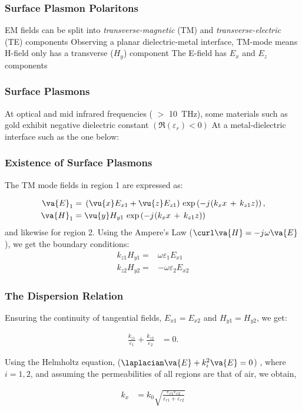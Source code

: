 \documentclass[10pt, compress]{beamer}
\renewcommand{\O}{\omega}  %
\newcommand{\E}{\varepsilon}  %
\renewcommand{\j}{{j}\mkern1mu} %
\begin{document}
\begin{frame}
  \frametitle{Surface Plasmon Polaritons}
  \begin{outline}
    \1 EM fields can be split into \textit{transverse-magnetic} (TM) and \textit{transverse-electric} (TE) components
    \1 Observing a planar dielectric-metal interface, TM-mode means H-field only has a transverse ($H_y$) component
    \2 The E-field has $E_x$ and $E_z$ components
  \end{outline}
\end{frame}

\begin{frame}
  \frametitle{Surface Plasmons}
  \begin{outline}
    \1 At optical and mid infrared frequencies ( $>$ \SI{10}{\tera \hertz}), some materials such as gold exhibit negative dielectric constant $(\Re(\E_r) < 0)$ 
    \1 At a metal-dielectric interface such as the one below:
  \end{outline}
  \begin{figure}
    \centering 
  \def\svgwidth{.75\linewidth}
    
  \end{figure}
\end{frame}


\begin{frame}
  \frametitle{Existence of Surface Plasmons}
  \begin{outline}
    \1 The TM mode fields in region 1 are expressed as:
  \end{outline}
      \begin{align*}
    \va{E}_1 ={}& \left(\vu{x} E_{x1}  + \vu{z} E_{z1}  \right) \, \exp \left( - \j (k_x x \,+\, k_{z1} z) \right), \\
    \va{H}_1 ={}& \vu{y} H_{y1}  \, \exp \left( - \j (k_x x \,+\, k_{z1} z) \right)
  \end{align*}
  and likewise for region 2. Using the Ampere's Law ($\curl \va{H} = -\j \O \va{E}$), we get the boundary conditions:
    \begin{align*}
    k_{z1} H_{y1} ={}& \O \E_1 E_{x1}\\
    k_{z2} H_{y2} ={}& -\O \E_2 E_{x2}
  \end{align*}
\end{frame}

\begin{frame}
  \frametitle{The Dispersion Relation}
  \begin{outline}
    \1 Ensuring the continuity of tangential fields, $E_{x1} = E_{x2}$ and $H_{y1} = H_{y2}$, we get:
    \end{outline}
    \begin{align*}
  \frac{k_{z1}}{\E_1} + \frac{k_{z2}}{\E_2} &= 0.
\end{align*}
\begin{outline}
  \1 Using the Helmholtz equation, ($\laplacian \va{E} + k_i^2 \va{E} = 0$) , where $i = 1,2$, and assuming the permeabilities of all regions are that of air, we obtain,
\end{outline}
\begin{align*}
  k_x &= k_0 \sqrt{\frac{\E_{r1} \E_{r2}}{\E_{r1} + \E_{r2}}}
\end{align*}
\end{frame}
\end{document}

